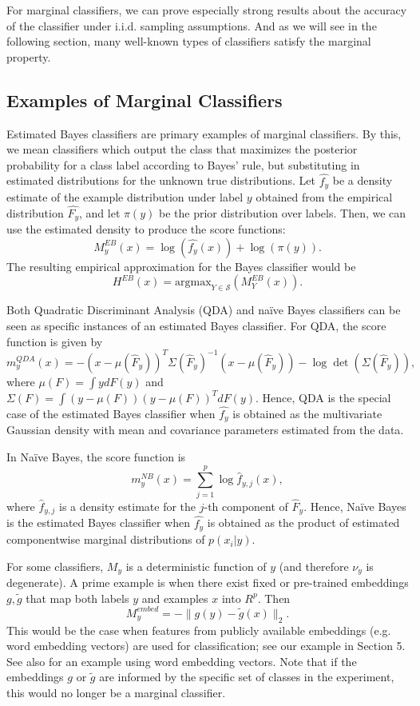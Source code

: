 \documentclass[twoside,11pt]{article}
\begin{document}
For marginal classifiers, we can prove especially
strong results about the accuracy of the classifier under
i.i.d. sampling assumptions.  And as we will see in the following section,
many well-known types of classifiers satisfy the marginal property.

\subsection{Examples of Marginal Classifiers}

Estimated Bayes classifiers are primary examples of marginal
  classifiers. By this, we mean classifiers which output the class that maximizes the posterior probability for a class label according to Bayes' rule, but substituting in estimated distributions for the unknown true distributions. %
  Let $\hat{f_y}$ be a density estimate of the example
  distribution under label $y$ obtained from the empirical
  distribution $\hat{F_y}$, and let $\pi(y)$ be the prior distribution over labels. Then, we can use the estimated density to
  produce the score functions:
\[ M^{EB}_y(x) = \log(\hat{f_{y}}(x)) + \log(\pi(y)).\]
The resulting empirical approximation for the Bayes classifier would
be
\[ H^{EB}(x) = \text{argmax}_{Y \in \mathcal{S}}(M^{EB}_Y(x)).\]

Both Quadratic Discriminant Analysis (QDA) and na\"{i}ve Bayes
  classifiers can be seen as specific instances of an estimated Bayes
  classifier.
For QDA, the score function is given by
\[
m_y^{QDA}(x) = -(x - \mu(\hat{F}_y))^T \Sigma(\hat{F}_y)^{-1} (x-\mu(\hat{F}_y)) - \log\det(\Sigma(\hat{F}_y)),
\]
where $\mu(F) = \int y dF(y)$ and $\Sigma(F) = \int (y-\mu(F))(y-\mu(F))^T dF(y)$.
Hence, QDA is the special case of the estimated Bayes classifier
  when $\hat{f_y}$ is obtained as the multivariate Gaussian density
  with mean and covariance parameters estimated from the data.

In Na\"{i}ve Bayes, the score function is
\[
m^{NB}_y(x) = \sum_{j=1}^p \log \hat{f}_{y, j}(x),
\]
where $\hat{f}_{y, j}$ is a density estimate for the $j$-th component of
$\hat{F}_y$.
Hence,  Na\"{i}ve
  Bayes is the estimated Bayes classifier when $\hat{f_y}$ is obtained
  as the product of estimated componentwise marginal distributions of
  $p(x_i|y)$.

For some classifiers, $M_y$ is a deterministic function of $y$
  (and therefore $\nu_y$ is degenerate). A prime example is when
  there exist fixed or pre-trained embeddings $g, \tilde{g}$ that map both
  labels $y$ and examples $x$ into $R^p$. Then
\begin{equation}
M_y^{embed} = -\|g(y) - \tilde{g}(x)\|_2.
\end{equation}
This would be the case when features from publicly available embeddings (e.g. word embedding vectors) are used for classification; see our example in Section 5.
See also \cite{pereira2018toward} for an example using word embedding vectors.
Note that if the embeddings $g$ or $\tilde{g}$ are informed by the specific set of classes in the experiment, this would no longer be a marginal classifier. %
\end{document}

